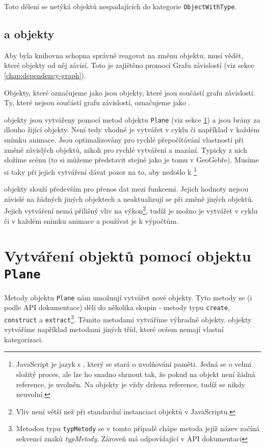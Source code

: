 Toto dělení se netýká objektů nespadajících do kategorie \texttt{ObjectWithType}.

\subsection[Bound a Unbound]{ a  objekty}
\label{subsec:bound-and-unbound}

Aby byla knihovna schopna správně reagovat na změnu objektu, musí vědět, které objekty od něj závisí.
Toto je zajištěno promocí Grafu závislostí (viz sekce \ref{chap:dependency-graph}).

Objekty, které označujeme jako  jsou objekty, které jsou součástí grafu závislostí.
Ty, které nejsou součástí grafu závislostí, označujeme jako .

 objekty jsou vytvářeny pomocí metod objektu \texttt{Plane} (viz sekce \ref{sec:creating-objects}) a jsou brány za dlouho žijící objekty. 
Není tedy vhodné je vytvářet v cyklu či například v každém snímku animace.
Jsou optimalizovány pro rychlé přepočítávání vlastností při změně závislých objektů, nikoli pro rychlé vytváření a mazání.
Typicky z nich složíme scénu (to si můžeme představit stejně jako je tomu v GeoGebře).
Musíme si taky při jejich vytváření dávat pozor na to, aby nedošlo k \footnote{JavaScript je jazyk s \cite{mdn:memory-management}, který se stará o uvolňování paměti. Jedná se o velmi složitý proces, ale lze ho snadno shrnout tak, že pokud na objekt není žádná reference, je uvolněn. Na  objekty je vždy držena reference, tudíž se nikdy neuvolní.} 

 objekty slouží především pro přenos dat mezi funkcemi. 
Jejich hodnoty nejsou závislé na žádných jiných objektech a neaktualizují se při změně jiných objektů.
Jejich vytváření nemá přílišný vliv na výkon\footnote{Vliv není větší než při standardní instanciaci objektů v JavaScriptu.}, tudíž je možno je vytvářet v cyklu či v každém snímku animace a používat je k výpočtům.\cite[volný překlad]{geometryjs:wiki:geometryObjects}


\section[Vytváření]{Vytváření objektů pomocí objektu \texttt{Plane}}
\label{sec:creating-objects}

Metody objektu \texttt{Plane} nám umožnují vytvářet nové objekty. 
Tyto metody se (i podle API dokumentace) dělí do několika skupin - metody typu \texttt{create}, \texttt{construct} a \texttt{extract}\footnote{Metodou typu \texttt{typMetody} se v tomto případě chápe metoda jejíž název začíná sekvencí znaků \textit{typMetody}. Zároveň má odpovídající  v API dokumentaci\cite{geometryjs:api}}\cite{geometryjs:wiki:geometryObjects}.
Těmito metodami vytváříme výhradně  objekty. 
 objekty vytváříme například metodami jiných tříd, které ovšem nemají vlastní kategorizaci.

